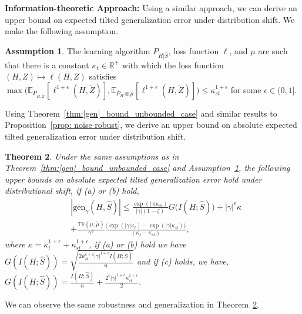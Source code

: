 \documentclass{article}
\theoremstyle{plain}
\theoremstyle{plain}
\newtheorem{theorem}{Theorem}[section]
\theoremstyle{definition}
\newtheorem{assumption}[theorem]{Assumption}
\theoremstyle{remark}
\newcommand{\mbE}{\mathbb{E}}
\begin{document}
\textbf{Information-theoretic Approach:} Using a similar approach, we can derive an upper bound on expected tilted generalization error under distribution shift. We make the following assumption.
\begin{assumption}\label{ass: bounded sec moment_robust_inf}
    The learning algorithm $P_{H|\hat{S}}$, loss function $\ell$, and $\mu$ are such that there is a constant $\kappa_t\in\mathbb{R}^+$ with which the loss function $(H,Z)\mapsto\ell(H,Z)$ satisfies $\max\big(\mbE_{P_{H,\tilde{Z}}}[\ell^{1+\epsilon}(H,\tilde{Z})],\mbE_{P_{H}\otimes \tilde{\mu}}[\ell^{1+\epsilon}(H,\tilde{Z})]\big)\leq \kappa_{st}^{1+\epsilon}$ for some $\epsilon\in(0,1]$.
\end{assumption}
Using Theorem~\ref{thm:|gen|_bound_unbounded_case} and similar results to Proposition~\ref{prop: noise robust}, we derive an upper bound on absolute expected tilted generalization error under distribution shift.
\begin{theorem}\label{thm:|gen|_bound_unbounded_case_robust}
Under the same assumptions as in Theorem~\ref{thm:|gen|_bound_unbounded_case} and Assumption~\ref{ass: bounded sec moment_robust_inf},
    the following upper bounds on absolute expected tilted generalization error hold under distributional shift, if (a) or (b) hold,
    \begin{equation*}
    \begin{split}
        &|\overline{\mathrm{gen}}_{\gamma}(H,\hat{S})|\leq \frac{\exp(|\gamma| \kappa_{st})}{|\gamma|(1-\zeta)} G\big(I(H;\hat{S})\big)+|\gamma|^\epsilon\kappa\\&+\frac{\mathbb{TV}(\mu,\tilde{\mu})}{\gamma^2 }\frac{\Big(\exp(|\gamma|\kappa_t)-\exp(|\gamma|\kappa_{st})\Big)}{(\kappa_t-\kappa_{st})},
    \end{split}
    \end{equation*}
    where $\kappa=\kappa_t^{1+\epsilon}+\kappa_{st}^{1+\epsilon}$, if (a) or (b) hold we have $G(I(H;\hat S))=\sqrt{\frac{2\kappa_{st}^{\epsilon+1} |\gamma|^{1+\epsilon} I(H;\hat S)}{n}}$ and if (c) holds, we have, $G(I(H;\hat S))=\frac{ I(H;\hat S)}{n}+\frac{2^{\epsilon}|\gamma|^{1+\epsilon} \kappa_{st}^{1+\epsilon}}{2}$.
\end{theorem}
We can observe the same robustness and generalization in Theorem~\ref{thm:|gen|_bound_unbounded_case_robust}.
\end{document}
